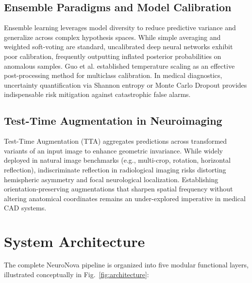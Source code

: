 \documentclass[runningheads]{llncs}
\begin{document}
\subsection{Ensemble Paradigms and Model Calibration}
Ensemble learning leverages model diversity to reduce predictive variance and generalize across complex hypothesis spaces. While simple averaging and weighted soft-voting are standard, uncalibrated deep neural networks exhibit poor calibration, frequently outputting inflated posterior probabilities on anomalous samples. Guo et al. established temperature scaling as an effective post-processing method for multiclass calibration. In medical diagnostics, uncertainty quantification via Shannon entropy or Monte Carlo Dropout provides indispensable risk mitigation against catastrophic false alarms.

\subsection{Test-Time Augmentation in Neuroimaging}
Test-Time Augmentation (TTA) aggregates predictions across transformed variants of an input image to enhance geometric invariance. While widely deployed in natural image benchmarks (e.g., multi-crop, rotation, horizontal reflection), indiscriminate reflection in radiological imaging risks distorting hemispheric asymmetry and focal neurological localization. Establishing orientation-preserving augmentations that sharpen spatial frequency without altering anatomical coordinates remains an under-explored imperative in medical CAD systems.

\section{System Architecture}
The complete NeuroNova pipeline is organized into five modular functional layers, illustrated conceptually in Fig.~\ref{fig:architecture}:
\end{document}
